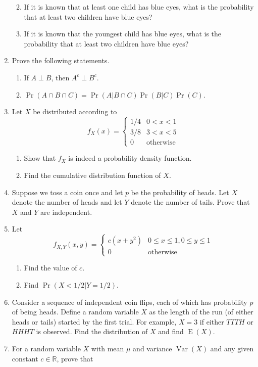 \documentclass[
]{book}
\providecommand{\tightlist}{%
  \setlength{\itemsep}{0pt}\setlength{\parskip}{0pt}}
\DeclareMathOperator{\E}{E}
\DeclareMathOperator{\Var}{Var}
\newcommand{\bbR}{\mathbb{R}}
\theoremstyle{definition}
\theoremstyle{definition}
\theoremstyle{definition}
\theoremstyle{definition}
\theoremstyle{remark}
\begin{document}
\begin{enumerate}
  \begin{enumerate}
  \def\labelenumii{(\alph{enumii})}
  \tightlist
  \item
    If it is known that at least one child has blue eyes, what is the probability that at least two children have blue eyes?
  \item
    If it is known that the youngest child has blue eyes, what is the probability that at least two children have blue eyes?
  \end{enumerate}
\item
  Prove the following statements.

  \begin{enumerate}
  \def\labelenumii{(\alph{enumii})}
  \tightlist
  \item
    If \(A \perp B\), then \(A^c \perp B^c\).
  \item
    \(\Pr(A \cap B \cap C) = \Pr(A| B \cap C)\Pr(B|C)\Pr(C)\).
  \end{enumerate}
\item
  Let \(X\) be distributed according to
  \[
  f_X(x) = \begin{cases}
   1/4&0<x<1\\
   3/8&3<x<5 \\
   0&\text{otherwise}
  \end{cases}
  \]

  \begin{enumerate}
  \def\labelenumii{(\alph{enumii})}
  \tightlist
  \item
    Show that \(f_X\) is indeed a probability density function.
  \item
    Find the cumulative distribution function of \(X\).
  \end{enumerate}
\item
  Suppose we toss a coin once and let \(p\) be the probability of heads. Let \(X\) denote the number of heads and let \(Y\) denote the number of tails. Prove that \(X\) and \(Y\) are independent.
\item
  Let
  \[
  f_{X,Y}(x,y) = \begin{cases}
   c(x+y^2) &0\leq x \leq 1, 0\leq y \leq 1 \\
   0&\text{otherwise}
  \end{cases}
  \]

  \begin{enumerate}
  \def\labelenumii{(\alph{enumii})}
  \tightlist
  \item
    Find the value of \(c\).
  \item
    Find \(\Pr(X<1/2 | Y=1/2)\).
  \end{enumerate}
\item
  Consider a sequence of independent coin flips, each of which has probability \(p\) of being heads. Define a random variable \(X\) as the length of the run (of either heads or tails) started by the first trial. For example, \(X=3\) if either \(TTTH\) or \(HHHT\) is observed. Find the distribution of \(X\) and find \(\E(X)\).
\item
  For a random variable \(X\) with mean \(\mu\) and variance \(\Var(X)\) and any given constant \(c\in\bbR\), prove that


\end{enumerate}
\end{document}
